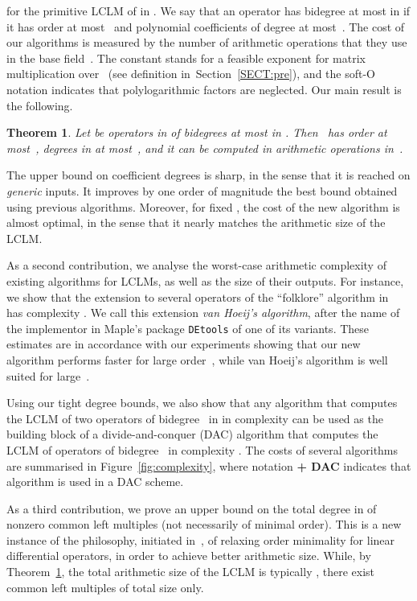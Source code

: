 \documentclass{sig-alt-full}
\newtheorem{theorem}{Theorem}
\begin{document}
for the primitive LCLM of  in  .
We say that an operator  has bidegree at most
 in  if it has order at most~ and polynomial
coefficients of degree at most~.
The cost of our algorithms is measured by the number of
arithmetic operations that they use in the base field~. The constant
 stands for a feasible exponent for matrix multiplication
over~ (see definition in~Section~\ref{SECT:pre}), and the soft-O notation  indicates that
polylogarithmic factors are neglected. 
Our main result is the following.
\begin{theorem} \label{th:main}
	Let  be  operators in 
of bidegrees at most  in .
Then~ has order at most~, degrees in
 at most~, and it can be computed in  arithmetic operations in~. 
\end{theorem}

The upper bound  on coefficient degrees is sharp, in the sense that it is reached on \emph{generic\/} inputs. 
It improves by one order of magnitude the best bound  obtained using
previous algorithms. Moreover, for fixed , the cost of the new
algorithm is almost optimal, in the sense that it nearly matches the
arithmetic size of the LCLM. 

As a second contribution, we analyse the worst-case arithmetic complexity of
existing algorithms for LCLMs, as well as the size of their outputs. For
instance, we show that the extension to several operators 
of the ``folklore'' algorithm
in~\cite{Stanley80,SaZi94}  has complexity
. We call this extension \emph{van
Hoeij's algorithm}, after the name of the implementor in Maple's package
\verb+DEtools+ of one of its variants. These estimates are in accordance with our experiments showing
that our new algorithm performs faster for large order~, while van Hoeij's
algorithm is well suited for large~. 

Using our tight degree bounds, we also show that any algorithm that
computes the LCLM of two operators of bidegree~ in  in
complexity  can be used as the building block of
a divide-and-conquer (DAC) algorithm that computes the LCLM of  operators
of bidegree~ in complexity . The costs of several algorithms
are summarised in Figure~\ref{fig:complexity}, where notation {\bf
 + DAC} indicates that algorithm {\bf } is used in
a DAC scheme.

As a third contribution, we prove an upper bound  on the total degree in  of nonzero common left multiples
(not necessarily of minimal order). 
This is a new instance of the philosophy, initiated
in~\cite{BoChLeSaSc07}, of relaxing order minimality for linear differential
operators, in order to achieve better arithmetic size. While, by
Theorem~\ref{th:main}, the total arithmetic size of the LCLM is typically
, there exist common left multiples of total size 
only.
\end{document}
